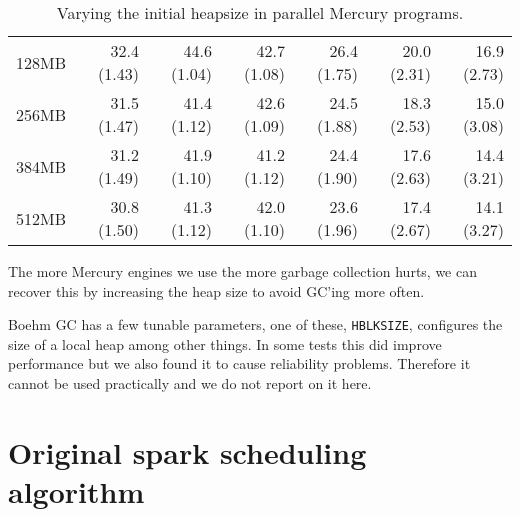 \begin{table}
\begin{center}
\begin{tabular}{r|rr|rrrr}
128MB  & 32.4 (1.43) & 44.6 (1.04) & 42.7 (1.08) & 26.4 (1.75) & 20.0 (2.31) & 16.9 (2.73) \\
256MB  & 31.5 (1.47) & 41.4 (1.12) & 42.6 (1.09) & 24.5 (1.88) & 18.3 (2.53) & 15.0 (3.08) \\
384MB  & 31.2 (1.49) & 41.9 (1.10) & 41.2 (1.12) & 24.4 (1.90) & 17.6 (2.63) & 14.4 (3.21) \\
512MB  & 30.8 (1.50) & 41.3 (1.12) & 42.0 (1.10) & 23.6 (1.96) & 17.4 (2.67) & 14.1 (3.27) \\
\end{tabular}
\end{center}
\caption{Varying the initial heapsize in parallel Mercury programs.}
\label{tab:heapsize}
\end{table}

The more Mercury engines we use the more garbage collection hurts,
we can recover this by increasing the heap size to avoid GC'ing more often.


Boehm GC has a few tunable parameters, one of these, \texttt{HBLKSIZE},
configures the size of a local heap among other things.
In some tests this did improve performance but we also found it to cause
reliability problems.
Therefore it cannot be used practically and we do not report on it here.


\section{Original spark scheduling algorithm}
\label{sec:old_scheduling}





